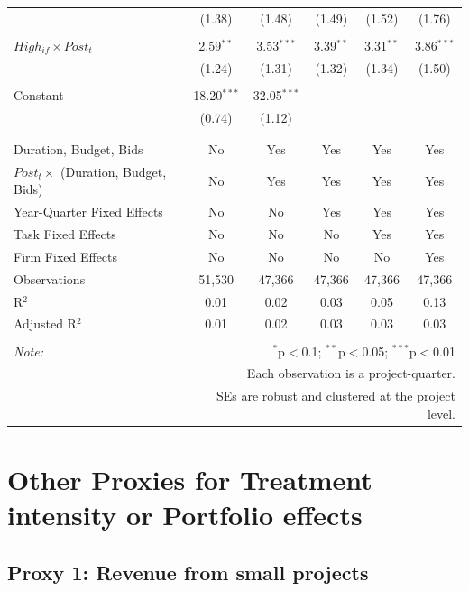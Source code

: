 \documentclass[
]{article}
\begin{document}
\begin{table}[H]
\begin{tabular}{@{\extracolsep{-2pt}}lccccc}
  & (1.38) & (1.48) & (1.49) & (1.52) & (1.76) \\ 
  & & & & & \\ 
 $High_{if} \times Post_t$ & 2.59$^{**}$ & 3.53$^{***}$ & 3.39$^{**}$ & 3.31$^{**}$ & 3.86$^{***}$ \\ 
  & (1.24) & (1.31) & (1.32) & (1.34) & (1.50) \\ 
  & & & & & \\ 
 Constant & 18.20$^{***}$ & 32.05$^{***}$ &  &  &  \\ 
  & (0.74) & (1.12) &  &  &  \\ 
  & & & & & \\ 
\hline \\[-1.8ex] 
Duration, Budget, Bids & No & Yes & Yes & Yes & Yes \\ 
$Post_t \times$  (Duration, Budget, Bids) & No & Yes & Yes & Yes & Yes \\ 
Year-Quarter Fixed Effects & No & No & Yes & Yes & Yes \\ 
Task Fixed Effects & No & No & No & Yes & Yes \\ 
Firm Fixed Effects & No & No & No & No & Yes \\ 
Observations & 51,530 & 47,366 & 47,366 & 47,366 & 47,366 \\ 
R$^{2}$ & 0.01 & 0.02 & 0.03 & 0.05 & 0.13 \\ 
Adjusted R$^{2}$ & 0.01 & 0.02 & 0.03 & 0.03 & 0.03 \\ 
\hline 
\hline \\[-1.8ex] 
\textit{Note:}  & \multicolumn{5}{r}{$^{*}$p$<$0.1; $^{**}$p$<$0.05; $^{***}$p$<$0.01} \\ 
 & \multicolumn{5}{r}{Each observation is a project-quarter.} \\ 
 & \multicolumn{5}{r}{SEs are robust and clustered at the project level.} \\ 
\end{tabular} 
\end{table}

\hypertarget{other-proxies-for-treatment-intensity-or-portfolio-effects}{%
\section{Other Proxies for Treatment intensity or Portfolio
effects}\label{other-proxies-for-treatment-intensity-or-portfolio-effects}}

\hypertarget{proxy-1-revenue-from-small-projects}{%
\subsection{Proxy 1: Revenue from small
projects}\label{proxy-1-revenue-from-small-projects}}
\end{document}
